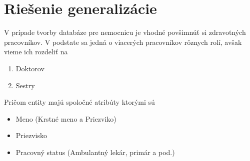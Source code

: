 \section{Riešenie generalizácie}

V prípade tvorby databáze pre nemocnicu je vhodné povšimnúť si zdravotných pracovníkov. V podstate sa jedná o viacerých
pracovníkov rǒznych rolí, avšak vieme ich rozdeliť na
\begin{enumerate}
    \item Doktorov
    \item Sestry
\end{enumerate}

Pričom entity majú spoločné atribúty ktorými sú

\begin{itemize}
    \item Meno (Krstné meno a Priezviko)
    \item Priezvisko
    \item Pracovný status (Ambulantný lekár, primár a pod.)
\end{itemize}
